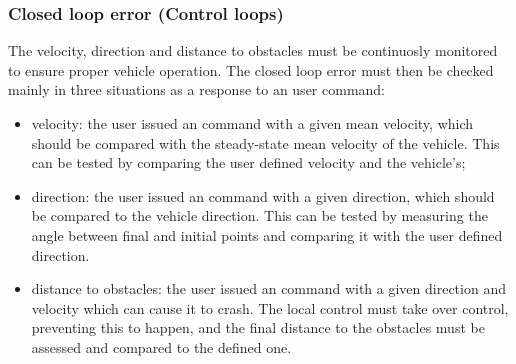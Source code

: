 \subsubsection{Closed loop error (Control loops)}%
\label{sec:closed-loop-error}
The velocity, direction and distance to obstacles must be continuosly monitored
to ensure proper vehicle operation. The closed loop error must then be checked
mainly in three situations as a response to an user command:
\begin{itemize}
\item velocity: the user issued an command with a given mean velocity, which
  should be compared with the steady-state mean velocity of the vehicle. This
  can be tested by comparing the user defined velocity and the vehicle's;
\item direction: the user issued an command with a given direction, which should
  be compared to the vehicle direction. This can be tested by measuring the
  angle between final and initial points and comparing it with the user defined
  direction.
\item distance to obstacles: the user issued an command with a given direction
  and velocity which can cause it to crash. The local control must take over
  control, preventing this to happen, and the final distance to the obstacles
  must be assessed and compared to the defined one.
\end{itemize}

%
%

